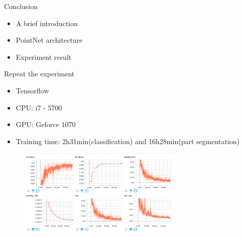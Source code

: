 \documentclass[serif,mathserif]{beamer}
\begin{document}
\begin{frame}{Conclusion}
	\begin{itemize}
		\item A brief introduction
		\item PointNet architecture
		\item Experiment result
	\end{itemize}
\end{frame}

\begin{frame}{Repeat the experiment}
	\begin{itemize}
		\item Tensorflow
		\item CPU: i7 - 5700
		\item GPU: Geforce 1070
		\item Training time: 2h31min(classification) and 16h28min(part segmentation)
	\end{itemize}
	\begin{figure}
		\includegraphics[width=8cm]{image/classify_log.png}
	\end{figure}
\end{frame}
\end{document}
